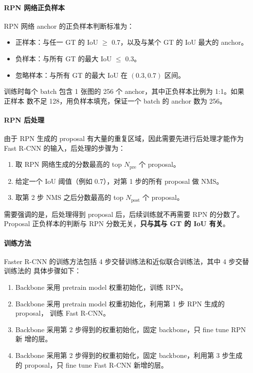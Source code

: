 \paragraph{RPN 网络正负样本}
RPN 网络 anchor 的正负样本判断标准为：

\begin{itemize}
  \item 正样本：与任一 GT 的 IoU $ \geq $ 0.7，以及与某个 GT 的 IoU 最大的 anchor。
  \item 负样本：与所有 GT 的最大 IoU $ \leq $ 0.3。
  \item 忽略样本：与所有 GT 的最大 IoU 在 $(0.3, 0.7)$ 区间。
\end{itemize}

训练时每个 batch 包含 1 张图的 256 个 anchor，其中正负样本比例为 1:1。如果正样本
数不足 128，用负样本填充，保证一个 batch 的 anchor 数为 256。

\paragraph{RPN 后处理}
由于 RPN 生成的 proposal 有大量的重复区域，因此需要先进行后处理才能作为 Fast
R-CNN 的输入，后处理的步骤为：

\begin{enumerate}
\item 取 RPN 网络生成的分数最高的 top $N_{\mathrm{pre}}$ 个 proposal。
\item 给定一个 IoU 阈值（例如 0.7），对第 1 步的所有 proposal 做 NMS。
\item 取第 2 步 NMS 之后分数最高的 top $N_{\mathrm{post}}$ 个 proposal。
\end{enumerate}

需要强调的是，后处理得到 proposal 后，后续训练就不再需要 RPN 的分数了。Proposal
正负样本的判断与 RPN 分数无关，\textbf{只与其与 GT 的 IoU 有关}。

\paragraph{训练方法}

Faster R-CNN 的训练方法包括 4 步交替训练法和近似联合训练法，其中 4 步交替训练法的
具体步骤如下：

\begin{enumerate}
  \item Backbone 采用 pretrain model 权重初始化，训练 RPN。
  \item Backbone 采用 pretrain model 权重初始化，利用第 1 步 RPN 生成的 proposal，
    训练 Fast R-CNN。
  \item Backbone 采用第 2 步得到的权重初始化，固定 backbone，只 fine tune RPN 新
    增的层。
  \item Backbone 采用第 2 步得到的权重初始化，固定 backbone，利用第 3 步生成
    的 proposal，只 fine tune Fast R-CNN 新增的层。
\end{enumerate}

